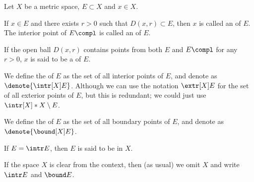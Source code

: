 \begin{definition}
    \label{def:mopen}
    Let \(X\) be a metric space,
    \(E\subset X\) and \(x\in X\).
    \begin{nlist}
        \item If \(x\in E\)
        and there exists \(r>0\) such that \(D(x,r)\subset E\),
        then \(x\) is called
        an  of \(E\).
        The interior point of \(E\compl\) is called
        an  of \(E\).
        
        \item If the open ball \(D(x,r)\) contains points from
        both \(E\) and \(E\compl\) for any \(r>0\),
        \(x\) is said to be
        a  of \(E\).

        \item We define the  of \(E\)
        as the set of all interior points of \(E\),
        and denote as \(\denote{\intr[X]E}\).
        Although we can use the notation \(\extr[X]E\)
        for the set of all exterior points of \(E\),
        but this is redundant;
        we could just use \(\intr[X]*{X\setminus E}\).

        \item We define the  of \(E\)
        as the set of all boundary points of \(E\),
        and denote as \(\denote{\bound[X]E}\).

        \item If \(E=\intr E\),
        then \(E\) is said to be  in \(X\).
    \end{nlist}
\end{definition}

If the space \(X\) is clear from the context,
then (as usual) we omit \(X\) and write \(\intr E\) and \(\bound E\).

